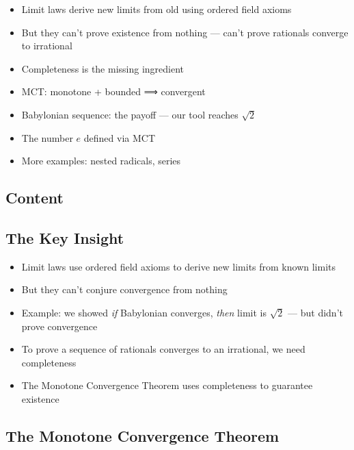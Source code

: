 \documentclass[
  10pt,
  letterpaper,
]{scrbook}
\providecommand{\tightlist}{%
  \setlength{\itemsep}{0pt}\setlength{\parskip}{0pt}}
\begin{document}
\begin{itemize}
\tightlist
\item
  Limit laws derive new limits from old using ordered field axioms
\item
  But they can't prove existence from nothing --- can't prove rationals
  converge to irrational
\item
  Completeness is the missing ingredient
\item
  MCT: monotone + bounded ⟹ convergent
\item
  Babylonian sequence: the payoff --- our tool reaches \(\sqrt{2}\)
\item
  The number \(e\) defined via MCT
\item
  More examples: nested radicals, series
\end{itemize}

\subsection{Content}\label{content-8}

\subsection{The Key Insight}\label{the-key-insight}

\begin{itemize}
\tightlist
\item
  Limit laws use ordered field axioms to derive new limits from known
  limits
\item
  But they can't conjure convergence from nothing
\item
  Example: we showed \emph{if} Babylonian converges, \emph{then} limit
  is \(\sqrt{2}\) --- but didn't prove convergence
\item
  To prove a sequence of rationals converges to an irrational, we need
  completeness
\item
  The Monotone Convergence Theorem uses completeness to guarantee
  existence
\end{itemize}

\subsection{The Monotone Convergence
Theorem}\label{the-monotone-convergence-theorem}
\end{document}
